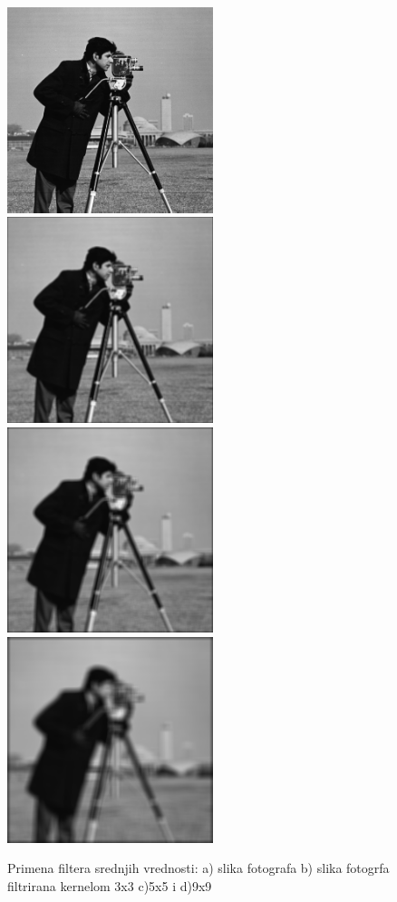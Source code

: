 \documentclass[a4paper,12pt,titlepage]{article}
\begin{document}
\begin{figure}[ht!]
\centering
\includegraphics[width=60mm]{img/img.png}
\includegraphics[width=60mm]{img/imgAvg3.png}
\includegraphics[width=60mm]{img/imgAvg5.png}
\includegraphics[width=60mm]{img/imgAvg9.png}
\caption{Primena filtera srednjih vrednosti: a) slika fotografa b) slika fotogrfa filtrirana kernelom 3x3 c)5x5 i d)9x9}
\label{overflow}
\end{figure}
\end{document}
